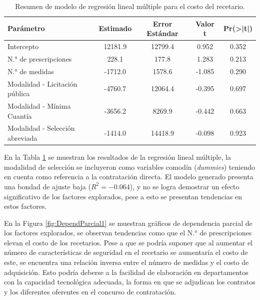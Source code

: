 \documentclass[
]{book}
\begin{document}
\begin{table}

\caption{\label{tab:resumenModeloRegresionLineal}Resumen de modelo de regresión lineal múltiple para el costo del recetario.}
\centering
\begin{tabular}[t]{lcccc}
\toprule
Parámetro & Estimado & Error Estándar & Valor t & Pr(>|t|)\\
\midrule
Intercepto & 12181.9 & 12799.4 & 0.952 & 0.352\\
N.° de prescripciones & 228.1 & 177.8 & 1.283 & 0.213\\
N.° de medidas & -1712.0 & 1578.6 & -1.085 & 0.290\\
Modalidad - Licitación pública & -4760.7 & 12064.4 & -0.395 & 0.697\\
Modalidad - Mínima Cuantía & -3656.2 & 8269.9 & -0.442 & 0.663\\
\addlinespace
Modalidad - Selección abreviada & -1414.0 & 14418.9 & -0.098 & 0.923\\
\bottomrule
\end{tabular}
\end{table}

En la Tabla \ref{tab:resumenModeloRegresionLineal} se muestran los resultados de la regresión lineal múltiple, la modalidad de selección se incluyeron como variables comodín (\emph{dummies}) teniendo en cuenta como referencia a la contratación directa. El modelo generado presenta una bondad de ajuste baja (\(R^{2} = -0.064\)), y no se logra demostrar un efecto significativo de los factores explorados, pese a esto se presentan tendencias en estos factores.

En la Figura \ref{fig:DependParcial1} se muestran gráficos de dependencia parcial de los factores explorados, se observan tendencias como que el N.° de prescripciones elevan el costo de los recetarios. Pese a que se podría suponer que al aumentar el número de características de seguridad en el recetario se aumentaría el costo de este, se encuentra una relación inversa entre el número de medidas y el costo de adquisición. Esto podría deberse a la facilidad de elaboración en departamentos con la capacidad tecnológica adecuada, la forma en que se adjudican los contratos y los diferentes oferentes en el concurso de contratación.
\end{document}
